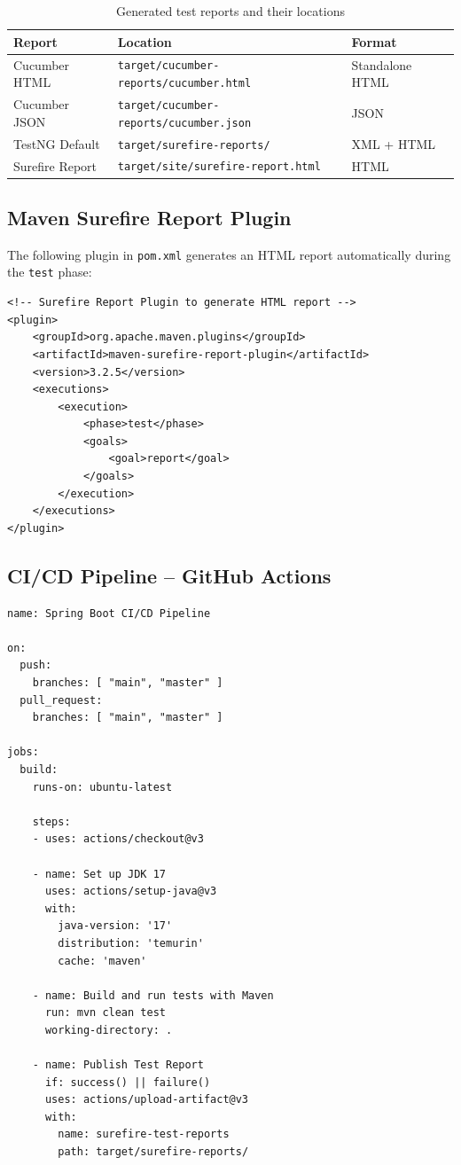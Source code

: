 \documentclass[12pt,a4paper]{article}
\begin{document}
\begin{table}[h!]
\centering
\begin{tabular}{lll}
    \toprule
    \textbf{Report} & \textbf{Location} & \textbf{Format} \\
    \midrule
    Cucumber HTML & \texttt{target/cucumber-reports/cucumber.html} & Standalone HTML \\
    Cucumber JSON & \texttt{target/cucumber-reports/cucumber.json} & JSON \\
    TestNG Default & \texttt{target/surefire-reports/} & XML + HTML \\
    Surefire Report & \texttt{target/site/surefire-report.html} & HTML \\
    \bottomrule
\end{tabular}
\caption{Generated test reports and their locations}
\end{table}

\subsection{Maven Surefire Report Plugin}

The following plugin in \texttt{pom.xml} generates an HTML report automatically during the \texttt{test} phase:

\begin{lstlisting}[style=xmlstyle, caption={Surefire report plugin configuration in \texttt{pom.xml}}]
<!-- Surefire Report Plugin to generate HTML report -->
<plugin>
    <groupId>org.apache.maven.plugins</groupId>
    <artifactId>maven-surefire-report-plugin</artifactId>
    <version>3.2.5</version>
    <executions>
        <execution>
            <phase>test</phase>
            <goals>
                <goal>report</goal>
            </goals>
        </execution>
    </executions>
</plugin>
\end{lstlisting}

\subsection{CI/CD Pipeline -- GitHub Actions}

\begin{lstlisting}[style=yamlstyle, caption={\texttt{.github/workflows/test.yml} -- CI/CD pipeline}]
name: Spring Boot CI/CD Pipeline

on:
  push:
    branches: [ "main", "master" ]
  pull_request:
    branches: [ "main", "master" ]

jobs:
  build:
    runs-on: ubuntu-latest

    steps:
    - uses: actions/checkout@v3

    - name: Set up JDK 17
      uses: actions/setup-java@v3
      with:
        java-version: '17'
        distribution: 'temurin'
        cache: 'maven'

    - name: Build and run tests with Maven
      run: mvn clean test
      working-directory: .

    - name: Publish Test Report
      if: success() || failure()
      uses: actions/upload-artifact@v3
      with:
        name: surefire-test-reports
        path: target/surefire-reports/
\end{lstlisting}
\end{document}
